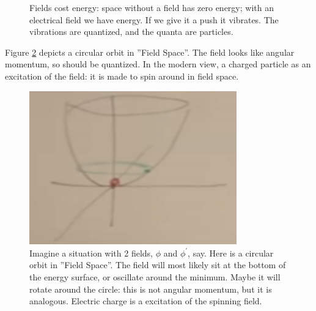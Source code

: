 \documentclass[]{article}
\begin{document}
\begin{figure}[H]
	\begin{center}
		\caption[Fields cost energy]{Fields cost energy: space without a field has zero energy; with an electrical field we have energy. If we give it a push it vibrates. The vibrations are quantized, and the quanta are particles. }\label{fig:higgs-fields-cost-energy}
	\end{center}
\end{figure}

Figure \ref{fig:2-appendix-field-circle} depicts a circular orbit in ''Field Space''. The field looks like angular momentum, so should be quantized. In the modern view,  a charged particle as an excitation of the field: it is made to spin around in field space.

\begin{figure}[H]
	\begin{center}
		\caption[Imagine a situation with 2 fields, $\phi$ and $\phi^{\prime}$, say.]{Imagine a situation with 2 fields, $\phi$ and $\phi^{\prime}$, say. Here is a circular orbit in ''Field Space''. The field will most likely sit at the bottom of the energy surface, or oscillate around the minimum. Maybe it will rotate around the circle: this is not angular momentum, but it is analogous. Electric charge is a excitation of the spinning field.}\label{fig:2-appendix-field-circle}
		\includegraphics[width=0.8\textwidth]{2-appendix-field-circle}
	\end{center}
\end{figure}
\end{document}
